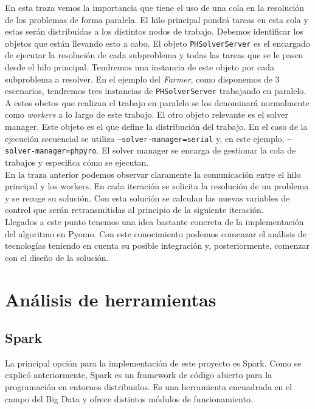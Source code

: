 En esta traza vemos la importancia que tiene el uso de una cola en la resolución de los problemas de forma paralela. El hilo principal pondrá tareas en esta cola y estas serán distribuidas a los distintos nodos de trabajo. Debemos identificar los objetos que están llevando esto a cabo. El objeto \texttt{PHSolverServer} es el encargado de ejecutar la resolución de cada subproblema y todas las tareas que se le pasen desde el hilo principal. Tendremos una instancia de este objeto por cada subproblema a resolver. En el ejemplo del \textit{Farmer}, como disponemos de 3 escenarios, tendremos tres instancias de \texttt{PHSolverServer} trabajando en paralelo. A estos obetos que realizan el trabajo en paralelo se los denominará normalmente como \textit{workers} a lo largo de este trabajo. El otro objeto relevante es el solver manager. Este objeto es el que define la distribución del trabajo. En el caso de la ejecución secuencial se utiliza \texttt{--solver-manager=serial} y, en este ejemplo, \texttt{--solver-manager=phpyro}. El solver manager se encarga de gestionar la cola de trabajos y especifica cómo se ejecutan.\\

En la traza anterior podemos observar claramente la comunicación entre el hilo principal y los workers. En cada iteración se solicita la resolución de un problema y se recoge su solución. Con esta solución se calculan las nuevas variables de control que serán retransmitidas al principio de la siguiente iteración. \\

Llegados a este punto tenemos una idea bastante concreta de la implementación del algoritmo en Pyomo. Con este conocimiento podemos comenzar el análisis de tecnologías teniendo en cuenta su posible integración y, posteriormente, comenzar con el diseño de la solución.

\section{Análisis de herramientas}

\subsection{Spark}


La principal opción para la implementación de este proyecto es Spark. Como se explicó anteriormente, Spark es un framework de código abierto para la programación en entornos distribuidos. Es una herramienta encuadrada en el campo del Big Data y ofrece distintos módulos de funcionamiento.\\

